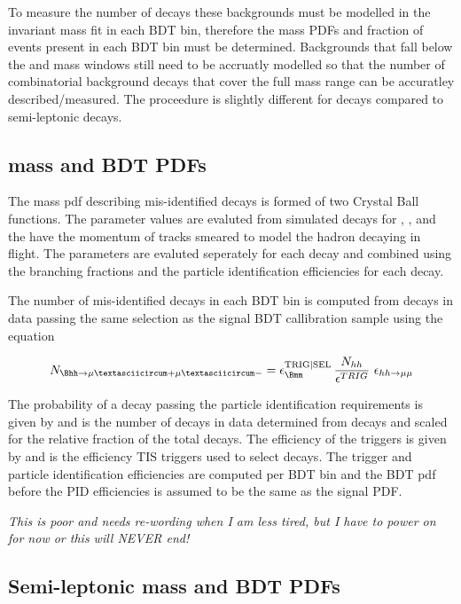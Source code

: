 To measure the number of \bsmumu decays these backgrounds must be modelled  in the invariant mass fit in each BDT bin, therefore the mass PDFs and fraction of events present in each BDT bin must be determined.  Backgrounds that fall below the \bd and \bs mass windows still need to be accruatly modelled so that the number of combinatorial background decays that cover the full mass range can be accuratley described/measured. The proceedure is slightly different for \bhh decays compared to semi-leptonic decays.

\subsection{\bhh mass and BDT PDFs}
The mass pdf describing mis-identified \bhh decays is formed of two Crystal Ball functions. The parameter values are evaluted from simulated decays for \bdkpi, \bskk, \bdpipi and \bsKpi the have the momentum of tracks smeared to model the hadron decaying in flight. The parameters are evaluted seperately for each decay and combined using the branching fractions and the particle identification efficiencies for each decay.

The number of mis-identified \bhh decays in each BDT bin is computed from \bdkpi decays in data passing the same selection as the signal BDT callibration sample using the equation

\begin{equation}
N_{\Bhh \to \muˆ+ \muˆ-} = \epsilon^{\rm TRIG|SEL}_{\Bmm} \, \frac{N_{hh}}{\epsilon^{TRIG}} \,\, \epsilon_{hh\to \mu\mu}  \\

\end{equation}

The probability of a \bhh decay passing the \bmumu particle identification requirements is given by  and   is the number of \bhh decays in data determined from \bdkpi decays and scaled for the relative fraction of the total \bhh decays. The efficiency of the \bmumu triggers is given by and  is the efficiency TIS triggers used to select \bdkpi decays. The trigger and particle identification efficiencies are computed per BDT bin and the BDT pdf before the PID efficiencies is assumed to be the same as the signal PDF. 

{\it This is poor and needs re-wording when I am less tired, but I have to power on for now or this will NEVER end!}

\subsection{Semi-leptonic mass and BDT PDFs}

